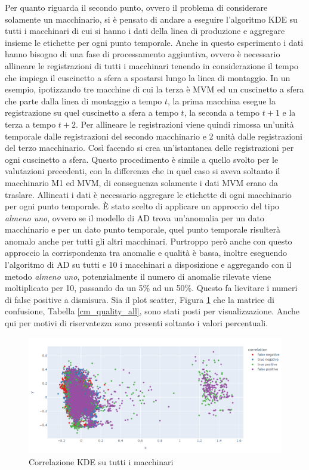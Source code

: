 Per quanto riguarda il secondo punto, ovvero il problema di considerare solamente un macchinario, si è pensato di andare a eseguire l'algoritmo KDE su tutti i macchinari di cui si hanno i dati della linea di produzione e aggregare insieme le etichette per ogni punto temporale.
Anche in questo esperimento i dati hanno bisogno di una fase di processamento aggiuntiva, ovvero è necessario allineare le registrazioni di tutti i macchinari tenendo in considerazione il tempo che impiega il cuscinetto a sfera a spostarsi lungo la linea di montaggio. In un esempio, ipotizzando tre macchine di cui la terza è MVM ed un cuscinetto a sfera che parte dalla linea di montaggio a tempo $t$, la prima macchina esegue la registrazione su quel cuscinetto a sfera a tempo $t$, la seconda a tempo $t+1$ e la terza a tempo $t+2$. Per allineare le registrazioni viene quindi rimossa un'unità temporale dalle registrazioni del secondo macchinario e 2 unità dalle registrazioni del terzo macchinario. Così facendo si crea un'istantanea delle registrazioni per ogni cuscinetto a sfera. Questo procedimento è simile a quello svolto per le valutazioni precedenti, con la differenza che in quel caso si aveva soltanto il macchinario M1 ed MVM, di conseguenza solamente i dati MVM erano da traslare.
Allineati i dati è necessario aggregare le etichette di ogni macchinario per ogni punto temporale. È stato scelto di applicare un approccio del tipo \textit{almeno uno}, ovvero se il modello di AD trova un'anomalia per un dato macchinario e per un dato punto temporale, quel punto temporale risulterà anomalo anche per tutti gli altri macchinari. 
Purtroppo però anche con questo approccio la corrispondenza tra anomalie e qualità è bassa, inoltre eseguendo l'algoritmo di AD su tutti e 10 i macchinari a disposizione e aggregando con il metodo \textit{almeno uno}, potenzialmente il numero di anomalie rilevate viene moltiplicato per 10, passando da un 5\% ad un 50\%. Questo fa lievitare i numeri di false positive a dismisura. Sia il plot scatter, Figura \ref{quality_all_machines} che la matrice di confusione, Tabella \ref{cm_quality_all}, sono stati posti per visualizzazione. Anche qui per motivi di riservatezza sono presenti soltanto i valori percentuali.

\begin{figure}[t]
	\centering
	\includegraphics[width=14cm, scale=1]{images/correlation_all_quality_plot.png}
	\caption{Correlazione KDE su tutti i macchinari}
	\label{quality_all_machines}
\end{figure}

